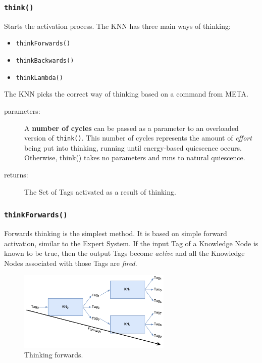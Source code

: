 \documentclass{beamer}
\newcommand{\code}[1]{\texttt{#1}}
\begin{document}
	\begin{frame}
		\frametitle{\code{think()}}
		Starts the activation process. The KNN has three main ways of thinking:
		\begin{itemize}
			\item \code{thinkForwards()}
			\item \code{thinkBackwards()}
			\item \code{thinkLambda()}
		\end{itemize}
		The KNN picks the correct way of thinking based on a command from META.
		\begin{description}
			\item[parameters:] A \textbf{number of cycles} can be passed as a parameter to an overloaded version of \code{think()}. This number of cycles represents the amount of \emph{effort} being put into thinking, running until energy-based quiescence  occurs. Otherwise, think() takes no parameters and runs to natural quiescence.
			\item[returns:] The Set of Tags activated as a result of thinking.
		\end{description}
	\end{frame}

	\begin{frame}
		\frametitle{\code{thinkForwards()}}
		Forwards thinking is the simplest method. It is based on simple forward activation, similar to the Expert System. If the input Tag of a Knowledge Node is known to be true, then the output Tags become \emph{active} and all the Knowledge Nodes associated with those Tags are \emph{fired}.
		\begin{figure}
			\centering
			\includegraphics[width=0.65\textwidth]{figures/forwards_thinking.pdf}
			\caption
			{Thinking forwards.}
			\label{fig:forwards_thinking}
		\end{figure}
	\end{frame}
\end{document}
